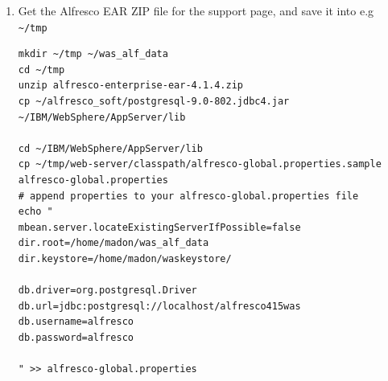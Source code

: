 \documentclass[10pt,a4]{article}
\begin{document}
\begin{enumerate}
\begin{verbatim}
server = AdminConfig.getid("/Server:server1/")

# increase the Max Heap:
jvmid = AdminConfig.list("JavaVirtualMachine", server)
AdminConfig.show(jvmid).splitlines()
attrs = [["maximumHeapSize", 2048]]
AdminConfig.modify(jvmid, attrs)

# workaround IE bugs, see MNT-3525
services=AdminConfig.list("TransportChannelService",server)
channels=AdminConfig.list("HTTPInboundChannel",services)
opts=[]
opts.append(["validationExpression", ""])
opts.append(["name", "CookiesConfigureNoCache"])
opts.append(["description", "workaround IE6,7,8 bug see MNT-3525"])
opts.append(["value", "false"])
opts.append(["required", "false"])
for http in channels.split("\n"):
    hname=AdminConfig.showAttribute(http, "name")
    if  hname=="HTTP_2":
        print ("Setting CookiesConfigureNoCache to false for", http)
        AdminConfig.create("Property",http,opts)

# saving config
AdminConfig.save()
\end{verbatim}

Note: you can write all the jythin commands to a file called script1.py and then execute it with:


\begin{verbatim}
wsadmin.sh -lang jython -f  script1.p
\end{verbatim}


\item Get the Alfresco EAR ZIP file for the support page, and save it into e.g  {\tt \textasciitilde/tmp}
\begin{verbatim}
mkdir ~/tmp ~/was_alf_data
cd ~/tmp
unzip alfresco-enterprise-ear-4.1.4.zip
cp ~/alfresco_soft/postgresql-9.0-802.jdbc4.jar ~/IBM/WebSphere/AppServer/lib

cd ~/IBM/WebSphere/AppServer/lib
cp ~/tmp/web-server/classpath/alfresco-global.properties.sample alfresco-global.properties
# append properties to your alfresco-global.properties file
echo "
mbean.server.locateExistingServerIfPossible=false
dir.root=/home/madon/was_alf_data
dir.keystore=/home/madon/waskeystore/

db.driver=org.postgresql.Driver
db.url=jdbc:postgresql://localhost/alfresco415was
db.username=alfresco
db.password=alfresco

" >> alfresco-global.properties
\end{verbatim}



\end{enumerate}
\end{document}
